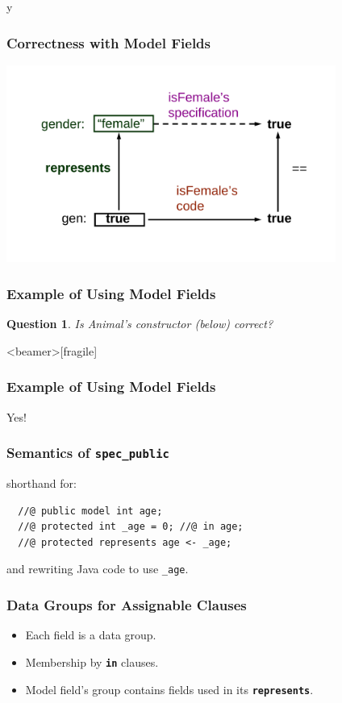 \if y\MAKEHANDOUTS \documentclass[t,compress,landscape,handout]{beamer}
\newcommand{\JMLKW}[1]{\textcolor{violet!80!black}{\textbf{\texttt{#1}}}}
\newtheorem*{question}{Question}
\begin{document}
\begin{frame}
\frametitle{Correctness with Model Fields}
\includegraphics[width=4.25in]{model-correctness}
\end{frame}

\begin{frame}[fragile]
\frametitle{Example of Using Model Fields}
\begin{question}
Is Animal's constructor (below) correct?
\rm

\end{question}
\end{frame}

\begin{frame}<beamer>[fragile]
\frametitle{Example of Using Model Fields}

\alert{Yes!}



\end{frame}

\begin{frame}[fragile]
\frametitle{Semantics of \lstinline!spec_public!}


shorthand for:

\begin{lstlisting}
  //@ public model int age;
  //@ protected int _age = 0; //@ in age;
  //@ protected represents age <- _age; 
\end{lstlisting}

and rewriting Java code to use \lstinline!_age!.

\end{frame}

\begin{frame}
\frametitle{Data Groups for Assignable Clauses}
\begin{itemize}
\item
Each field is a data group.

\item
Membership by \JMLKW{in} clauses.

\item
Model field's group contains
fields used in its \JMLKW{represents}.
\end{itemize}
\end{frame}
\end{document}
